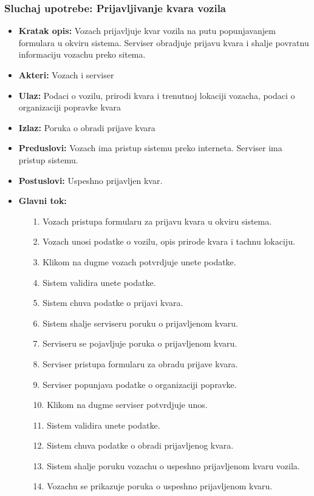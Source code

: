 \subsubsection{Sluchaj upotrebe: Prijavljivanje kvara vozila}
\begin{itemize}
\item{\textbf{Kratak opis:} Vozach prijavljuje kvar vozila na putu popunjavanjem formulara u okviru sistema. Serviser obradjuje prijavu kvara i shalje povratnu informaciju vozachu preko sitema.}
\item{\textbf{Akteri:} Vozach i serviser}
\item{\textbf{Ulaz:} Podaci o vozilu, prirodi kvara i trenutnoj lokaciji vozacha, podaci o organizaciji popravke kvara }
\item{\textbf{Izlaz:} Poruka o obradi prijave kvara }
\item{\textbf{Preduslovi:} Vozach ima pristup sistemu preko interneta. Serviser ima pristup sistemu. }
\item{\textbf{Postuslovi:} Uspeshno prijavljen kvar.}
\item{\textbf{Glavni tok:} 
\begin{enumerate}
    \item [1.] Vozach pristupa formularu za prijavu kvara u okviru sistema.
    \item[2.] Vozach unosi podatke o vozilu, opis prirode kvara i tachnu lokaciju.
    \item[3.] Klikom na dugme vozach potvrdjuje unete podatke.
    \item[4.] Sistem validira unete podatke.
    \item[5.] Sistem chuva podatke o prijavi kvara.
    \item[6.] Sistem shalje serviseru poruku o prijavljenom kvaru.
    \item[7.] Serviseru se pojavljuje poruka o prijavljenom kvaru.
    \item[8.] Serviser pristupa formularu za obradu prijave kvara.
    \item[9.] Serviser popunjava podatke o organizaciji popravke.
    \item[10.] Klikom na dugme serviser potvrdjuje unos.
    \item[11.] Sistem validira unete podatke.
    \item [12.] Sistem chuva podatke o obradi prijavljenog kvara.
    \item[13.] Sistem shalje poruku vozachu o uspeshno prijavljenom kvaru vozila. 
    \item[14.] Vozachu se prikazuje poruka o uspeshno prijavljenom kvaru.
    

\end{enumerate}}
\end{itemize}
